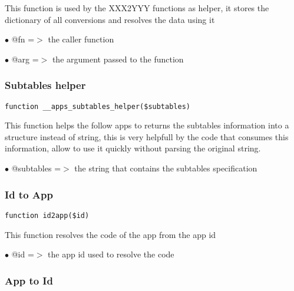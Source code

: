 \documentclass[a4paper]{article}
\begin{document}
This function is used by the XXX2YYY functions as helper, it stores the
dictionary of all conversions and resolves the data using it

\begin{compactitem}
\item[\color{myblue}$\bullet$] @fn  =$>$ the caller function
\item[\color{myblue}$\bullet$] @arg =$>$ the argument passed to the function
\end{compactitem}

\hypertarget{toc16}{}
\subsubsection{Subtables helper}

\begin{lstlisting}
function __apps_subtables_helper($subtables)
\end{lstlisting}

This function helps the follow apps to returns the subtables information into
a structure instead of string, this is very helpfull by the code that consumes
this information, allow to use it quickly without parsing the original string.

\begin{compactitem}
\item[\color{myblue}$\bullet$] @subtables =$>$ the string that contains the subtables specification
\end{compactitem}

\hypertarget{toc17}{}
\subsubsection{Id to App}

\begin{lstlisting}
function id2app($id)
\end{lstlisting}

This function resolves the code of the app from the app id

\begin{compactitem}
\item[\color{myblue}$\bullet$] @id =$>$ the app id used to resolve the code
\end{compactitem}

\hypertarget{toc18}{}
\subsubsection{App to Id}
\end{document}
